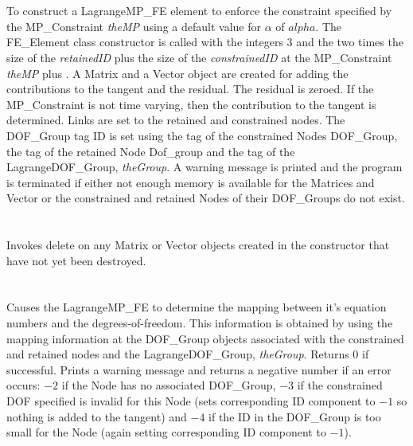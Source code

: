   \\
\\
To construct a LagrangeMP\_FE element to enforce the constraint
specified by the MP\_Constraint {\em theMP} using a default value for
$\alpha$ of $alpha$. The FE\_Element class constructor is called with
the integers $3$ and the two times the size of the {\em retainedID}
plus the size of the {\em constrainedID} at the MP\_Constraint {\em
theMP} plus . A Matrix and a Vector object are created for adding the
contributions to the tangent and the residual. The residual is
zeroed. If the
MP\_Constraint is not time varying, then the contribution to the
tangent is determined. Links are set to the retained and constrained
nodes. The DOF\_Group tag ID is set using the tag of the constrained
Nodes DOF\_Group, the tag of the retained Node Dof\_group and the tag
of the LagrangeDOF\_Group, {\em theGroup}. A warning message is printed and 
the program is terminated if either not enough memory is available for
the Matrices and Vector or the constrained and retained Nodes of their
DOF\_Groups do not exist. \\



  \\
  \\
Invokes delete on any Matrix or Vector objects created in the
constructor that have not yet been destroyed. \\

  \\
 \\
Causes the LagrangeMP\_FE to determine the mapping between it's equation
numbers and the degrees-of-freedom. This information is obtained by
using the mapping information at the DOF\_Group objects associated with
the constrained and retained nodes and the LagrangeDOF\_Group, {\em
theGroup}. Returns $0$ if
successful. Prints a warning message and returns a negative number if
an error occurs: $-2$ if the
Node has no associated DOF\_Group, $-3$ if the constrained DOF
specified is invalid for this Node (sets corresponding ID component to
$-1$ so nothing is added to the tangent) and $-4$ if the ID in the
DOF\_Group is too small for the Node (again setting corresponding ID
component to $-1$). \\ 

